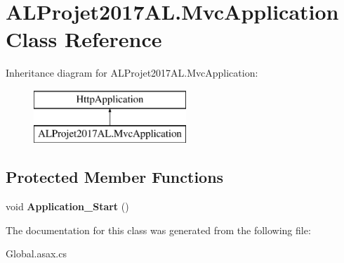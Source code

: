 \hypertarget{class_a_l_projet2017_a_l_1_1_mvc_application}{}\section{A\+L\+Projet2017\+A\+L.\+Mvc\+Application Class Reference}
\label{class_a_l_projet2017_a_l_1_1_mvc_application}
Inheritance diagram for A\+L\+Projet2017\+A\+L.\+Mvc\+Application\+:\begin{figure}[H]
\begin{center}
\leavevmode
\includegraphics[height=2.000000cm]{class_a_l_projet2017_a_l_1_1_mvc_application}
\end{center}
\end{figure}
\subsection*{Protected Member Functions}
\begin{DoxyCompactItemize}
\item 
void {\bfseries Application\+\_\+\+Start} ()\hypertarget{class_a_l_projet2017_a_l_1_1_mvc_application_aa7f4a7352bf6be8138289267920d3d66}{}\label{class_a_l_projet2017_a_l_1_1_mvc_application_aa7f4a7352bf6be8138289267920d3d66}

\end{DoxyCompactItemize}


The documentation for this class was generated from the following file\+:\begin{DoxyCompactItemize}
\item 
Global.\+asax.\+cs\end{DoxyCompactItemize}
